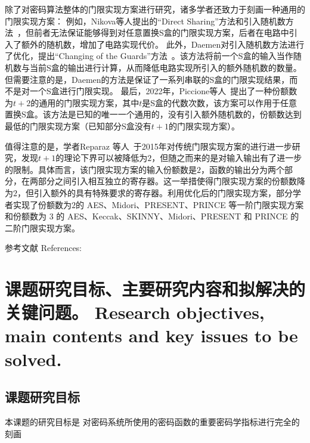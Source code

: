 \documentclass[a4paper,zihao=-4,AutoFakeBold]{ctexart}
\begin{document}
除了对密码算法整体的门限实现方案进行研究，诸多学者还致力于刻画一种通用的门限实现方案：
例如，Nikova等人提出的``Direct Sharing''方法和引入随机数方法~\cite{NikovaRSJoC11}，但前者无法保证能够得到对任意置换S盒的门限实现方案，后者在电路中引入了额外的随机数，增加了电路实现代价。
此外，Daemen对引入随机数方法进行了优化，提出``Changing of the Guards''方法~\cite{DaemenCHES17}。该方法将前一个S盒的输入当作随机数与当前S盒的输出进行计算，从而降低电路实现所引入的额外随机数的数量。但需要注意的是，Daemen的方法是保证了一系列串联的S盒的门限实现结果，而不是对一个S盒进行门限实现。
最后，2022年，Piccione等人~\cite{Piccione23TI_tp2}提出了一种份额数为$t+2$的通用的门限实现方案，其中$t$是S盒的代数次数，该方案可以作用于任意置换S盒。该方法是已知的唯一一个通用的，没有引入额外随机数的，份额数达到最低的门限实现方案（已知部分S盒没有$t+1$的门限实现方案）。

值得注意的是，学者Reparaz 等人~\cite{Reparaz15}于2015年对传统门限实现方案的进行进一步研究，发现$t+1$的理论下界可以被降低为$2$，但随之而来的是对输入输出有了进一步的限制。具体而言，该门限实现方案的输入份额数是$2$，函数的输出分为两个部分，在两部分之间引入相互独立的寄存器。这一举措使得门限实现方案的份额数降为$2$，但引入额外的具有特殊要求的寄存器。利用优化后的门限实现方案，部分学者实现了份额数为$2$的 AES、Midori、PRESENT、PRINCE 等一阶门限实现方案和份额数为 3 的 AES、Keccak、SKINNY、Midori、PRESENT 和 PRINCE 的二阶门限实现方案。

\vspace{2\baselineskip}
{
    \linespread{1.25}\selectfont%
    参考文献 References:
    \printbibliography[heading=none]
}


\section{课题研究目标、主要研究内容和拟解决的关键问题。
  Research objectives, main contents and key issues to be solved.}
\subsection{课题研究目标}
本课题的研究目标是
对密码系统所使用的密码函数的重要密码学指标进行完全的刻画
\end{document}
